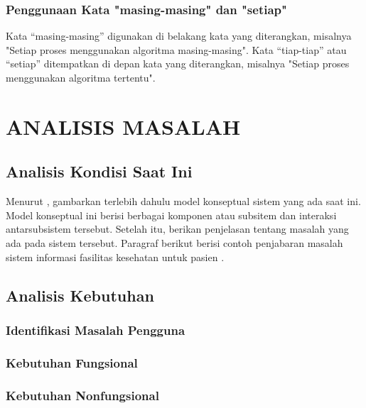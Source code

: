 \documentclass[12pt,a4paper,oneside]{book}
\begin{document}
\subsection{Penggunaan Kata "masing-masing" dan "setiap"}
Kata “masing-masing” digunakan di belakang kata yang diterangkan, misalnya 
"Setiap proses menggunakan algoritma masing-masing". Kata “tiap-tiap” atau “setiap”
ditempatkan di depan kata yang diterangkan, misalnya
"Setiap proses menggunakan algoritma tertentu".



\chapter{ANALISIS MASALAH}
\section{Analisis Kondisi Saat Ini}
Menurut \textcite{laudon2020}, gambarkan terlebih dahulu model konseptual sistem yang ada saat ini. Model konseptual ini berisi berbagai komponen atau subsitem dan interaksi antarsubsistem tersebut. Setelah itu, berikan penjelasan tentang masalah yang ada pada sistem tersebut. Paragraf berikut berisi contoh penjabaran masalah sistem informasi fasilitas kesehatan untuk pasien \autocite{pressman2019}. 
\section{Analisis Kebutuhan}
\lipsum[4]
\subsection{Identifikasi Masalah Pengguna}
\lipsum[5]
\subsection{Kebutuhan Fungsional}
\lipsum[6]
\subsection{Kebutuhan Nonfungsional}
\lipsum[7]
\end{document}
